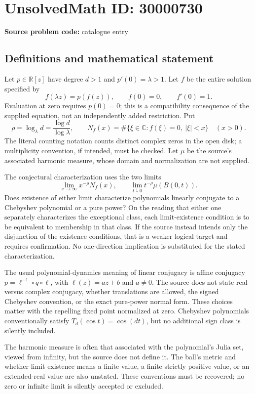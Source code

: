 \documentclass[11pt]{article}
\newcommand{\R}{\mathbb{R}}
\newcommand{\C}{\mathbb{C}}
\begin{document}
\section*{UnsolvedMath ID: 30000730}
\textbf{Source problem code:} catalogue entry
\subsection{Definitions and mathematical statement}
Let $p\in\R[z]$ have degree $d>1$ and $p'(0)=\lambda>1$. Let $f$ be the entire solution specified by
\[
 f(\lambda z)=p(f(z)),\qquad f(0)=0,\qquad f'(0)=1.
\]
Evaluation at zero requires $p(0)=0$; this is a compatibility consequence of the supplied equation, not an independently added restriction. Put
\[
 \rho=\log_\lambda d=\frac{\log d}{\log\lambda},\qquad
 N_f(x)=\#\{\xi\in\C:f(\xi)=0,\ |\xi|<x\}\quad(x>0).
\]
The literal counting notation counts distinct complex zeros in the open disk; a multiplicity convention, if intended, must be checked. Let $\mu$ be the source's associated harmonic measure, whose domain and normalization are not supplied.

The conjectural characterization uses the two limits
\[
 \lim_{x\to\infty}x^{-\rho}N_f(x),
 \qquad
 \lim_{t\downarrow0}t^{-\rho}\mu(B(0,t)).
\]
Does existence of either limit characterize polynomials linearly conjugate to a Chebyshev polynomial or a pure power? On the reading that either one separately characterizes the exceptional class, each limit-existence condition is to be equivalent to membership in that class. If the source instead intends only the disjunction of the existence conditions, that is a weaker logical target and requires confirmation. No one-direction implication is substituted for the stated characterization.

The usual polynomial-dynamics meaning of linear conjugacy is affine conjugacy $p=\ell^{-1}\circ q\circ\ell$, with $\ell(z)=az+b$ and $a\ne0$. The source does not state real versus complex conjugacy, whether translations are allowed, the signed Chebyshev convention, or the exact pure-power normal form. These choices matter with the repelling fixed point normalized at zero. Chebyshev polynomials conventionally satisfy $T_d(\cos t)=\cos(dt)$, but no additional sign class is silently included.

The harmonic measure is often that associated with the polynomial's Julia set, viewed from infinity, but the source does not define it. The ball's metric and whether limit existence means a finite value, a finite strictly positive value, or an extended-real value are also unstated. These conventions must be recovered; no zero or infinite limit is silently accepted or excluded.
\end{document}
